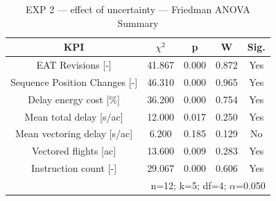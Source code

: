 \begin{table}[!t]
\caption{EXP 2 — effect of uncertainty — Friedman ANOVA Summary}
\begin{center}
\footnotesize
\setlength{\tabcolsep}{3pt}
\renewcommand{\arraystretch}{1.000}
\begin{tabular}{|c|c|c|c|c|}
\hline
\textbf{KPI} & \textbf{$\chi^2$} & \textbf{p} & \textbf{W} & \textbf{Sig.} \\
\hline
EAT Revisions [-] & 41.867 & 0.000 & 0.872 & Yes \\
\hline
Sequence Position Changes [-] & 46.310 & 0.000 & 0.965 & Yes \\
\hline
Delay energy cost [\%] & 36.200 & 0.000 & 0.754 & Yes \\
\hline
Mean total delay [s/ac] & 12.000 & 0.017 & 0.250 & Yes \\
\hline
Mean vectoring delay [s/ac] & 6.200 & 0.185 & 0.129 & No \\
\hline
Vectored flights [ac] & 13.600 & 0.009 & 0.283 & Yes \\
\hline
Instruction count [-] & 29.067 & 0.000 & 0.606 & Yes \\
\hline
\multicolumn{5}{r}{n=12; k=5; df=4; $\alpha$=0.050}\\
\end{tabular}
\label{tab:exp\_2\_effect\_of\_uncertainty\_friedman}
\end{center}
\end{table}